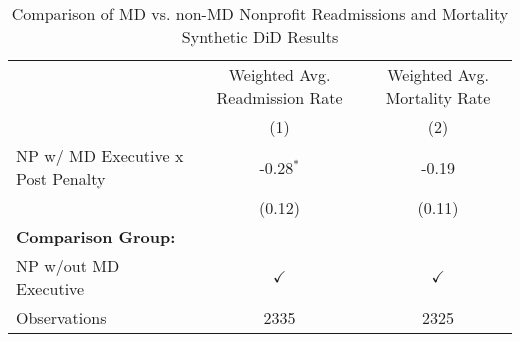 \begin{table}[ht!]

\caption{\label{tab:MD_noMD_synth}Comparison of MD vs. non-MD Nonprofit Readmissions and Mortality Synthetic DiD Results}
\centering
\begin{tabular}[t]{lcc}
\toprule
\multicolumn{1}{c}{ } & \multicolumn{1}{c}{Weighted Avg. Readmission Rate} & \multicolumn{1}{c}{Weighted Avg. Mortality Rate} \\
\cmidrule(l{3pt}r{3pt}){2-2} \cmidrule(l{3pt}r{3pt}){3-3}
 & (1) & (2)\\
\midrule
NP w/ MD Executive x Post Penalty & -0.28$^{*}$ & -0.19\\
 & (0.12) & (0.11)\\
\textbf{Comparison Group:} &  & \\
NP w/out MD Executive & $\checkmark$ & $\checkmark$\\
Observations & 2335 & 2325\\
\bottomrule
\end{tabular}
\end{table}
